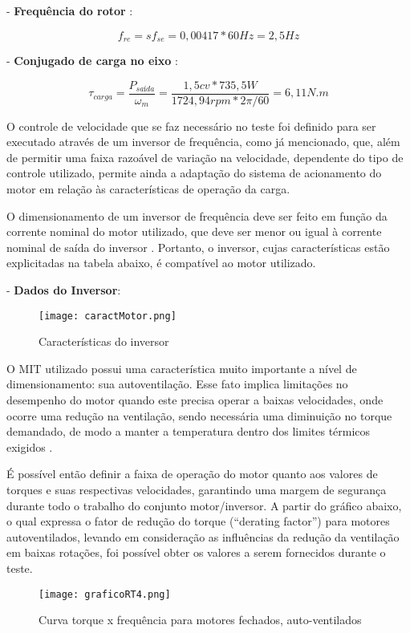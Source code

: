 	- \textbf{Frequência do rotor} :

	$$ f_{re} = sf_{se} = 0,00417 * 60Hz = 2,5Hz $$

	- \textbf{Conjugado de carga no eixo} :

	$$ \tau_{carga} = \frac{P_{saída}}{\omega_{m}} = \frac{1,5cv * 735,5W}{1724,94rpm * 2\pi/60} = 6,11 N.m $$

	O controle de velocidade que se faz necessário no teste foi definido para ser executado através de um inversor de frequência, como já mencionado, que, além de permitir uma faixa razoável de variação na velocidade, dependente do tipo de controle utilizado, permite ainda a adaptação do sistema de acionamento do motor em relação às características de operação da carga.
	
	O dimensionamento de um inversor de frequência deve ser feito em função da corrente nominal do motor utilizado, que deve ser menor ou igual à corrente nominal de saída do inversor \cite{WEGIF}. Portanto, o inversor, cujas características estão explicitadas na tabela abaixo, é compatível ao motor utilizado.

	- \textbf{Dados do Inversor}:

	\begin{figure}[!h]
		\centering
		\texttt{[image: caractMotor.png]}
		\caption[Características do inversor]{Características do inversor \cite{WEGIF}}
		\label{caractMotor}
	\end{figure}

	O MIT utilizado possui uma característica muito importante a nível de dimensionamento: sua autoventilação. Esse fato implica limitações no desempenho do motor quando este precisa operar a baixas velocidades, onde ocorre uma redução na ventilação, sendo necessária uma diminuição no torque demandado, de modo a manter a temperatura dentro dos limites térmicos exigidos \cite{WEGMotorEletrico}.

	É possível então definir a faixa de operação do motor quanto aos valores de torques e suas respectivas velocidades, garantindo uma margem de segurança durante todo o trabalho do conjunto motor/inversor. A partir do gráfico abaixo, o qual expressa o fator de redução do torque (“derating factor”) para motores autoventilados, levando em consideração as influências da redução da ventilação em baixas rotações, foi possível obter os valores a serem fornecidos durante o teste.

	\newpage
	\begin{figure}[!h]
		\centering
		\texttt{[image: graficoRT4.png]}
		\caption[Curva torque x frequência para motores fechados, auto-ventilados]{Curva torque x frequência para motores fechados, auto-ventilados \cite{WEGIF}}
		\label{graficoRT4}
	\end{figure}

